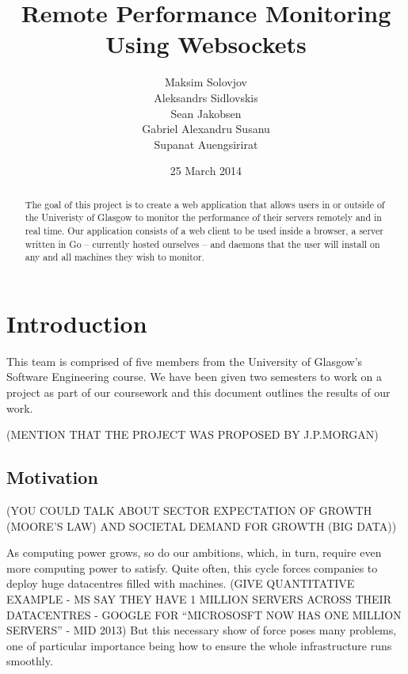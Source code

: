 \documentclass{l3proj}
\begin{document}
\title{Remote Performance Monitoring Using Websockets}
\author{Maksim Solovjov \\
        Aleksandrs Sidlovskis \\
        Sean Jakobsen \\
        Gabriel Alexandru Susanu \\
        Supanat Auengsirirat}
\date{25 March 2014}
\maketitle
\begin{abstract}

The goal of this project is to create a web application that allows users in or outside of the Univeristy of Glasgow to monitor the performance of their servers remotely and in real time. Our application consists of a web client to be used inside a browser, a server written in Go -- currently hosted ourselves -- and daemons that the user will install on any and all machines they wish to monitor.

\end{abstract}
\educationalconsent
\tableofcontents



\chapter{Introduction}
\label{intro}

This team is comprised of five members from the University of Glasgow's Software Engineering course. We have been given two semesters to work on a project as part of our coursework and this document outlines the results of our work.

(MENTION THAT THE PROJECT WAS PROPOSED BY J.P.MORGAN)

\section{Motivation}
\label{motivation}

(YOU COULD TALK ABOUT SECTOR EXPECTATION OF GROWTH (MOORE'S LAW) AND SOCIETAL DEMAND FOR GROWTH (BIG DATA))

As computing power grows, so do our ambitions, which, in turn, require even more computing power to satisfy. Quite often, this cycle forces companies to deploy huge datacentres filled with machines. (GIVE QUANTITATIVE EXAMPLE - MS SAY THEY HAVE 1 MILLION SERVERS ACROSS THEIR DATACENTRES - GOOGLE FOR ``MICROSOSFT NOW HAS ONE MILLION SERVERS'' - MID 2013) But this necessary show of force poses many problems, one of particular importance being how to ensure the whole infrastructure runs smoothly.
\end{document}
